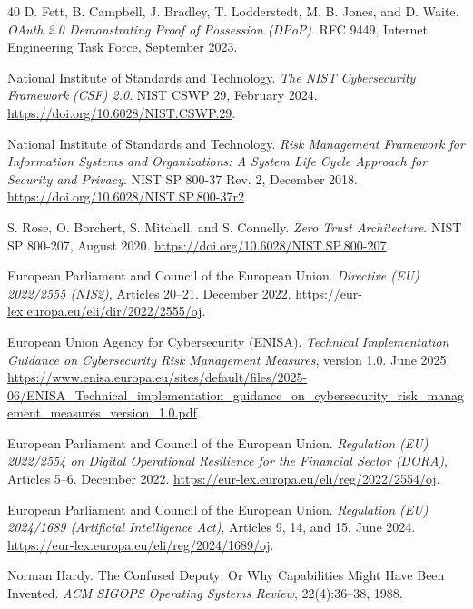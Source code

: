 \documentclass[10pt,oneside,openany]{book}
\begin{document}
\begin{thebibliography}{40}
D. Fett, B. Campbell, J. Bradley, T. Lodderstedt, M. B. Jones, and D. Waite.
\newblock \emph{OAuth 2.0 Demonstrating Proof of Possession (DPoP)}.
\newblock RFC 9449, Internet Engineering Task Force, September 2023.

National Institute of Standards and Technology.
\newblock \emph{The NIST Cybersecurity Framework (CSF) 2.0}.
\newblock NIST CSWP 29, February 2024. \url{https://doi.org/10.6028/NIST.CSWP.29}.

National Institute of Standards and Technology.
\newblock \emph{Risk Management Framework for Information Systems and Organizations: A System Life Cycle Approach for Security and Privacy}.
\newblock NIST SP 800-37 Rev. 2, December 2018. \url{https://doi.org/10.6028/NIST.SP.800-37r2}.

S. Rose, O. Borchert, S. Mitchell, and S. Connelly.
\newblock \emph{Zero Trust Architecture}.
\newblock NIST SP 800-207, August 2020. \url{https://doi.org/10.6028/NIST.SP.800-207}.

European Parliament and Council of the European Union.
\newblock \emph{Directive (EU) 2022/2555 (NIS2)}, Articles 20--21.
 December 2022. \url{https://eur-lex.europa.eu/eli/dir/2022/2555/oj}.

European Union Agency for Cybersecurity (ENISA).
\newblock \emph{Technical Implementation Guidance on Cybersecurity Risk Management Measures}, version 1.0.
\newblock June 2025. \url{https://www.enisa.europa.eu/sites/default/files/2025-06/ENISA_Technical_implementation_guidance_on_cybersecurity_risk_management_measures_version_1.0.pdf}.

European Parliament and Council of the European Union.
\newblock \emph{Regulation (EU) 2022/2554 on Digital Operational Resilience for the Financial Sector (DORA)}, Articles 5--6.
 December 2022. \url{https://eur-lex.europa.eu/eli/reg/2022/2554/oj}.

European Parliament and Council of the European Union.
\newblock \emph{Regulation (EU) 2024/1689 (Artificial Intelligence Act)}, Articles 9, 14, and 15.
 June 2024. \url{https://eur-lex.europa.eu/eli/reg/2024/1689/oj}.

Norman Hardy.
\newblock The Confused Deputy: Or Why Capabilities Might Have Been Invented.
\newblock \emph{ACM SIGOPS Operating Systems Review}, 22(4):36--38, 1988.
\end{thebibliography}
\end{document}
